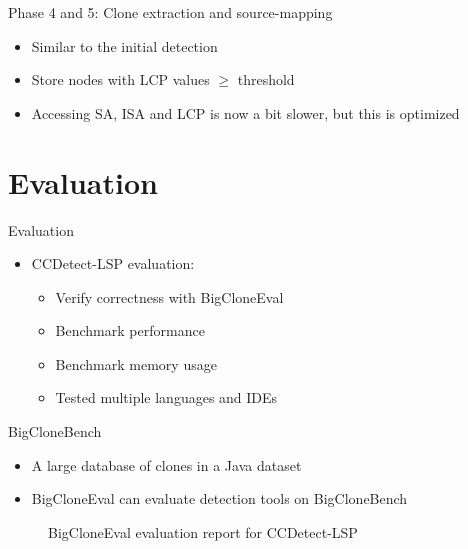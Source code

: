 \documentclass[aspectratio=1610, xcolor=table]{beamer}
\begin{document}
\begin{frame}[fragile]{Phase 4 and 5: Clone extraction and source-mapping}
    \begin{itemize}
        \item Similar to the initial detection
        \item Store nodes with LCP values $\geq$ threshold
        \item Accessing SA, ISA and LCP is now a bit slower, but this is optimized
    \end{itemize}
\end{frame}

\section{Evaluation}
\begin{frame}{Evaluation}
    \begin{itemize}
        \item CCDetect-LSP evaluation:
            \begin{itemize}
                \item Verify correctness with BigCloneEval
                \item Benchmark performance
                \item Benchmark memory usage
                \item Tested multiple languages and IDEs
            \end{itemize}
    \end{itemize}
\end{frame}

\begin{frame}{BigCloneBench}
    \begin{itemize}
        \item A large database of clones in a Java dataset
        \item BigCloneEval can evaluate detection tools on BigCloneBench
    \end{itemize}
    \begin{figure}
    \begin{alltt}
        
    \end{alltt}
    \caption{BigCloneEval evaluation report for CCDetect-LSP}
    \label{bcblog}
\end{figure}
\end{frame}
\end{document}
